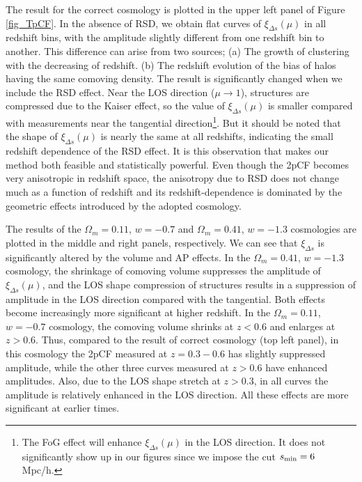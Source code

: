 \documentclass[useAMS,usenatbib]{mn2e}
\begin{document}
The result for the correct cosmology is plotted in the upper left panel of Figure \ref{fig_TpCF}.
In the absence of RSD, we obtain flat curves of $\xi_{\Delta s}(\mu)$ in all redshift bins,
with the amplitude slightly different from one redshift bin to another.
This difference can arise from two sources; (a) The growth of clustering with the decreasing of redshift.
(b) The redshift evolution of the bias of halos having the same comoving density.
The result is significantly changed when we include the RSD effect.
Near the LOS direction ($\mu\rightarrow1$), structures are compressed due to the Kaiser effect,
so the value of $\xi_{\Delta s}(\mu)$ is smaller compared with measurements near the tangential 
direction\footnote{The FoG effect will enhance $\xi_{\Delta s}(\mu)$ in the LOS direction.
It does not significantly show up in our figures since we impose the cut $s_{\rm min}=6$ Mpc/h.}.
But it should be noted that the shape of $\xi_{\Delta s}(\mu)$ is nearly the same at all redshifts,
indicating the small redshift dependence of the RSD effect.
It is this observation that makes our method both feasible and statistically powerful. 
Even though the 2pCF becomes very anisotropic in redshift space, the anisotropy due to RSD does not change much as a function 
of redshift and its redshift-dependence is dominated by the geometric effects introduced by the adopted cosmology.

The results of the $\Omega_m=0.11$, $w=-0.7$ and $\Omega_m=0.41$, $w=-1.3$ cosmologies are plotted in the middle and right panels, respectively.
We can see that $\xi_{\Delta s}$ is significantly altered by the volume and AP effects.
In the $\Omega_m=0.41$, $w=-1.3$ cosmology,
the shrinkage of comoving volume suppresses the amplitude of $\xi_{\Delta s}(\mu)$,
and the LOS shape compression of structures results in a suppression of amplitude in the LOS direction compared with the tangential.
Both effects become increasingly more significant at higher redshift.
In the $\Omega_m=0.11$, $w=-0.7$ cosmology, the comoving volume shrinks at $z<0.6$ and enlarges at $z>0.6$.
Thus, compared to the result of correct cosmology (top left panel),
in this cosmology the 2pCF measured at $z=0.3-0.6$ has slightly suppressed amplitude,
while the other three curves measured at $z>0.6$ have enhanced amplitudes.
Also, due to the LOS shape stretch at $z>0.3$, in all curves the amplitude is relatively enhanced in the LOS direction.
All these effects are more significant at earlier times.
\end{document}
